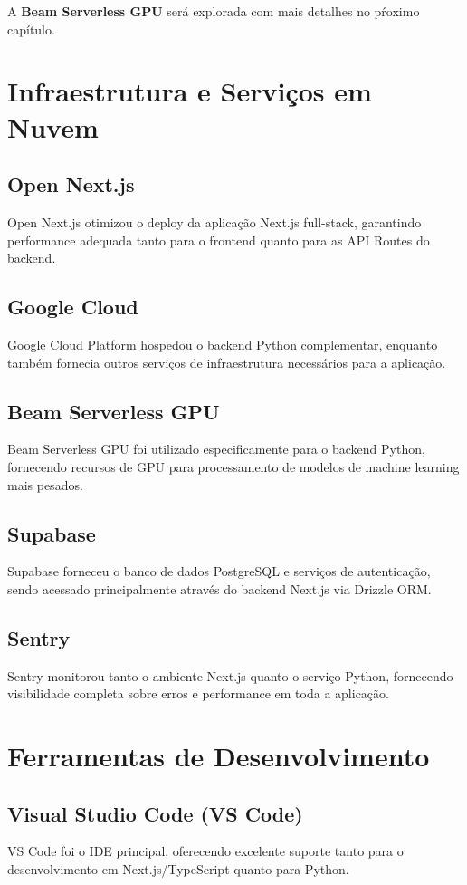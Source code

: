 \documentclass[tcc,capa]{texufpel}
\begin{document}
A \textbf{Beam Serverless GPU} será explorada com mais detalhes no pŕoximo capítulo.



\section{Infraestrutura e Serviços em Nuvem}

\subsection{Open Next.js}
Open Next.js otimizou o deploy da aplicação Next.js full-stack, garantindo performance adequada tanto para o frontend quanto para as API Routes do backend.

\subsection{Google Cloud}
Google Cloud Platform hospedou o backend Python complementar, enquanto também fornecia outros serviços de infraestrutura necessários para a aplicação.

\subsection{Beam Serverless GPU}
Beam Serverless GPU foi utilizado especificamente para o backend Python, fornecendo recursos de GPU para processamento de modelos de machine learning mais pesados.

\subsection{Supabase}
Supabase forneceu o banco de dados PostgreSQL e serviços de autenticação, sendo acessado principalmente através do backend Next.js via Drizzle ORM.

\subsection{Sentry}
Sentry monitorou tanto o ambiente Next.js quanto o serviço Python, fornecendo visibilidade completa sobre erros e performance em toda a aplicação.



\section{Ferramentas de Desenvolvimento}

\subsection{Visual Studio Code (VS Code)}
VS Code foi o IDE principal, oferecendo excelente suporte tanto para o desenvolvimento em Next.js/TypeScript quanto para Python.
\end{document}
